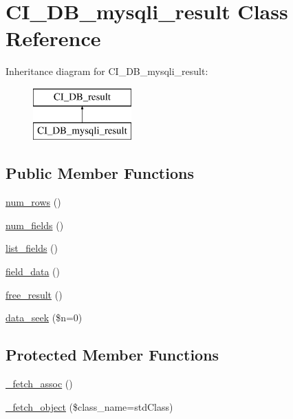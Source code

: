 \hypertarget{class_c_i___d_b__mysqli__result}{}\section{C\+I\+\_\+\+D\+B\+\_\+mysqli\+\_\+result Class Reference}
\label{class_c_i___d_b__mysqli__result}
Inheritance diagram for C\+I\+\_\+\+D\+B\+\_\+mysqli\+\_\+result\+:\begin{figure}[H]
\begin{center}
\leavevmode
\includegraphics[height=2.000000cm]{class_c_i___d_b__mysqli__result}
\end{center}
\end{figure}
\subsection*{Public Member Functions}
\begin{DoxyCompactItemize}
\item 
\mbox{\hyperlink{class_c_i___d_b__mysqli__result_a218657c303ee499b97710ab0cd2f5d6e}{num\+\_\+rows}} ()
\item 
\mbox{\hyperlink{class_c_i___d_b__mysqli__result_af831bf363e4d7d661a717a4932af449d}{num\+\_\+fields}} ()
\item 
\mbox{\hyperlink{class_c_i___d_b__mysqli__result_a50b54eb4ea7cfd039740f532988ea776}{list\+\_\+fields}} ()
\item 
\mbox{\hyperlink{class_c_i___d_b__mysqli__result_a84bffd65e53902ade1591716749a33e3}{field\+\_\+data}} ()
\item 
\mbox{\hyperlink{class_c_i___d_b__mysqli__result_aad2d98d6beb3d6095405356c6107b473}{free\+\_\+result}} ()
\item 
\mbox{\hyperlink{class_c_i___d_b__mysqli__result_a8255ae91816e4206e29eb7581c5af0f1}{data\+\_\+seek}} (\$n=0)
\end{DoxyCompactItemize}
\subsection*{Protected Member Functions}
\begin{DoxyCompactItemize}
\item 
\mbox{\hyperlink{class_c_i___d_b__mysqli__result_a43a9a92817f1334a1c10752ec44275a0}{\+\_\+fetch\+\_\+assoc}} ()
\item 
\mbox{\hyperlink{class_c_i___d_b__mysqli__result_a60806be6a9c2488820813c2a7f4fef71}{\+\_\+fetch\+\_\+object}} (\$class\+\_\+name=\textquotesingle{}std\+Class\textquotesingle{})
\end{DoxyCompactItemize}
